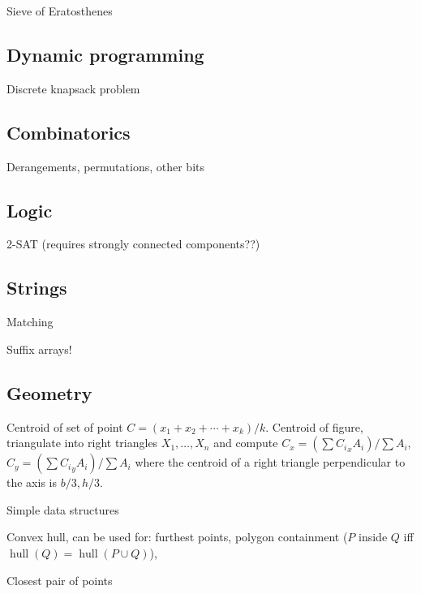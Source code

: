 \documentclass[10pt,a4paper]{article}
\newcommand{\codelisting}[1]{
  }
\begin{document}
Sieve of Eratosthenes
\codelisting{seive.java}

\subsection*{Dynamic programming}
Discrete knapsack problem
\codelisting{knapsack.java}

\subsection*{Combinatorics}
Derangements, permutations, other bits

\subsection*{Logic}
2-SAT (requires strongly connected components??)
\codelisting{2sat.java}

\subsection*{Strings}
Matching
\codelisting{kmp.java}


Suffix arrays!
\codelisting{suffix.java}

\subsection*{Geometry}
Centroid of set of point $C = (x_1 + x_2 + \cdots + x_k) / k$.
Centroid of figure, triangulate into right triangles $X_1,\ldots,X_n$ and compute $C_x = (\sum {C_i}_x A_{i})/\sum A_i$, $C_y = (\sum {C_i}_y A_{i})/\sum A_i$ where the centroid of a right triangle perpendicular to the axis is $b/3,h/3$.

Simple data structures
\codelisting{Point.java}

Convex hull, can be used for: furthest points, polygon containment ($P$ inside $Q$ iff $\operatorname{hull}(Q)  = \operatorname{hull}(P\cup Q)$),
\codelisting{convexhull.java}

Closest pair of points
\codelisting{closestpoints.java}
\end{document}
